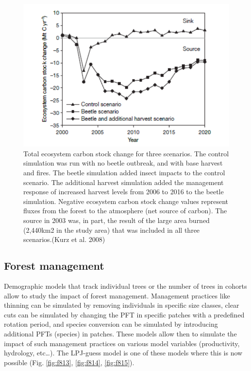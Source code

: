 \documentclass[12pt,oneside]{book}
\begin{document}
\begin{figure}

{\centering \includegraphics[width=0.8\linewidth]{figures/chap8/f812_Kurz3} 

}

\caption{Total ecosystem carbon stock change for three scenarios. The control simulation was run with no beetle outbreak, and with base harvest and fires. The beetle simulation added insect impacts to the control scenario. The additional harvest simulation added the management response of increased harvest levels from 2006 to 2016 to the beetle simulation. Negative ecosystem carbon stock change values represent fluxes from the forest to the atmosphere (net source of carbon). The source in 2003 was, in part, the result of the large area burned (2,440km2 in the study area) that was included in all three scenarios.(Kurz et al. 2008)}\label{fig:f812}
\end{figure}

\subsection{Forest management}\label{forest-management}

Demographic models that track individual trees or the number of trees in
cohorts allow to study the impact of forest management. Management
practices like thinning can be simulated by removing individuals in
specific size classes, clear cuts can be simulated by changing the PFT
in specific patches with a predefined rotation period, and species
conversion can be simulated by introducing additional PFTs (species) in
patches. These models allow then to simulate the impact of such
management practices on various model variables (productivity,
hydrology, etc\ldots{}). The LPJ-guess model is one of these models
where this is now possible (Fig. \ref{fig:f813}, \ref{fig:f814},
\ref{fig:f815}).
\end{document}
